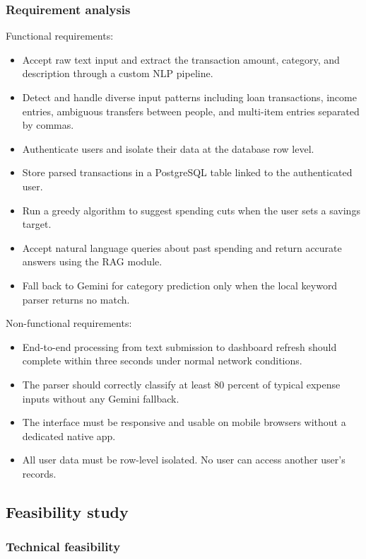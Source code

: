 \documentclass[12pt, a4paper]{article}
\begin{document}
\subsubsection{Requirement analysis}

Functional requirements:
\begin{itemize}
    \item Accept raw text input and extract the transaction amount, category, and description through a custom NLP pipeline.
    \item Detect and handle diverse input patterns including loan transactions, income entries, ambiguous transfers between people, and multi-item entries separated by commas.
    \item Authenticate users and isolate their data at the database row level.
    \item Store parsed transactions in a PostgreSQL table linked to the authenticated user.
    \item Run a greedy algorithm to suggest spending cuts when the user sets a savings target.
    \item Accept natural language queries about past spending and return accurate answers using the RAG module.
    \item Fall back to Gemini for category prediction only when the local keyword parser returns no match.
\end{itemize}

Non-functional requirements:
\begin{itemize}
    \item End-to-end processing from text submission to dashboard refresh should complete within three seconds under normal network conditions.
    \item The parser should correctly classify at least 80 percent of typical expense inputs without any Gemini fallback.
    \item The interface must be responsive and usable on mobile browsers without a dedicated native app.
    \item All user data must be row-level isolated. No user can access another user's records.
\end{itemize}

\subsection{Feasibility study}

\subsubsection{Technical feasibility}
\end{document}
